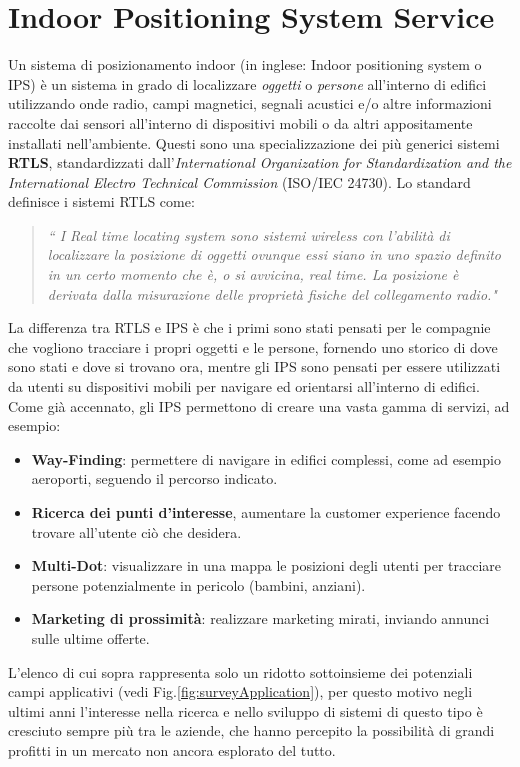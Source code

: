 \section{Indoor Positioning System Service}
Un sistema di posizionamento indoor (in inglese: Indoor positioning system o IPS) è un sistema in grado di localizzare \textit{oggetti} o \textit{persone} all'interno di edifici utilizzando onde radio, campi magnetici, segnali acustici e/o altre informazioni raccolte dai sensori all'interno di dispositivi mobili \cite{IPS} o da altri  appositamente installati nell'ambiente. Questi sono una specializzazione dei più generici sistemi \textbf{RTLS}, standardizzati dall'\textit{International
Organization for Standardization and the International Electro Technical Commission} (ISO/IEC 24730). Lo standard definisce i sistemi RTLS come:
\begin{quotation}
	\textit{“ I Real time locating system sono sistemi wireless con l'abilità di localizzare la posizione di oggetti ovunque essi siano in uno spazio definito in un certo momento che è, o si avvicina, real time. La posizione è derivata dalla misurazione delle proprietà fisiche del collegamento radio."}
\end{quotation}
La differenza tra RTLS e IPS è che i primi sono stati pensati per le compagnie che vogliono tracciare i propri oggetti e le persone, fornendo uno storico di dove sono stati e dove si trovano ora, mentre gli IPS sono pensati per essere utilizzati da utenti su dispositivi mobili per navigare ed orientarsi all'interno di edifici.
Come già accennato, gli IPS \cite{IPS2} permettono di creare una vasta gamma di servizi, ad esempio:
\begin{itemize}
	\item\textbf{Way-Finding}: permettere di navigare in edifici complessi, come ad esempio aeroporti, seguendo il percorso indicato.
	\item\textbf{Ricerca dei punti d'interesse}, aumentare la customer experience facendo trovare all’utente ciò che desidera.
	\item \textbf{Multi-Dot}: visualizzare in una mappa le posizioni degli utenti per tracciare persone potenzialmente in pericolo (bambini, anziani).
	\item \textbf{Marketing di prossimità}: realizzare marketing mirati, inviando annunci sulle ultime offerte.
\end{itemize}
L’elenco di cui sopra rappresenta solo un ridotto sottoinsieme dei potenziali campi applicativi (vedi Fig.\ref{fig:surveyApplication}), per questo motivo negli ultimi anni \cite{indoorThesis} l'interesse nella ricerca e nello sviluppo di sistemi di questo tipo è cresciuto sempre più tra le aziende, che hanno percepito la possibilità di grandi profitti in un mercato non ancora esplorato del tutto.
